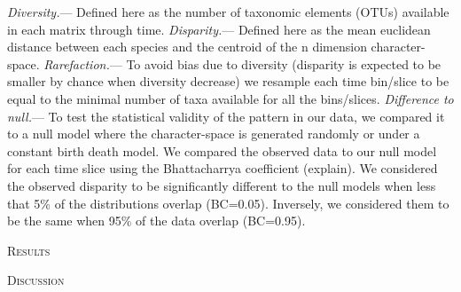 \documentclass[12pt,letterpaper]{article}
\renewcommand{\section}[1]{%
\bigskip
\begin{center}
\begin{Large}
\normalfont\scshape #1
\medskip
\end{Large}
\end{center}}
\renewcommand{\subsubsection}[1]{%
\vspace{2ex}
\noindent
\textit{#1.}---}
\begin{document}
\subsubsection{Diversity}
Defined here as the number of taxonomic elements (OTUs) available in each matrix through time.
\subsubsection{Disparity}
Defined here as the mean euclidean distance between each species and the centroid of the n dimension character-space.
\subsubsection{Rarefaction}
To avoid bias due to diversity (disparity is expected to be smaller by chance when diversity decrease) we resample each time bin/slice to be equal to the minimal number of taxa available for all the bins/slices.
\subsubsection{Difference to null}
To test the statistical validity of the pattern in our data, we compared it to a null model where the character-space is generated randomly or under a constant birth death model. We compared the observed data to our null model for each time slice using the Bhattacharrya  coefficient (explain). We considered the observed disparity to be significantly different to the null models when less that 5\% of the distributions overlap (BC=0.05). Inversely, we considered them to be the same when 95\% of the data overlap (BC=0.95).

%
%

\section{Results}

%
%

\section{Discussion}

%
%
\end{document}
